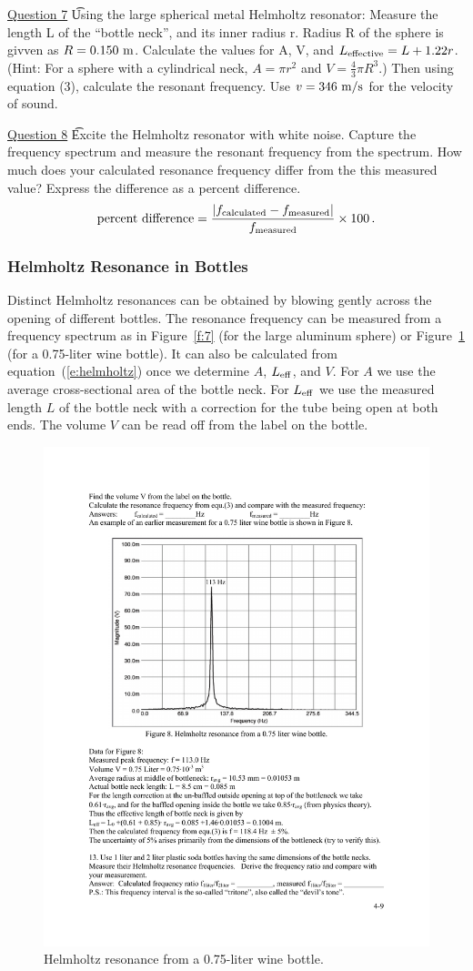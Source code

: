 \documentclass[11pt]{NSF}
\def\be{\begin{equation}}
\def\ee{\end{equation}}
\begin{document}
\underline{Question 7} \t Using the large spherical metal Helmholtz resonator: Measure the length L of the “bottle neck”, and its inner radius r. Radius R of the sphere is givven as $R=0.150~{\rm m}$. Calculate the values for A, V, and  $L_{\rm effective}=L+1.22 r$. (Hint: For a sphere with a cylindrical neck, $A=\pi r^2$ and $V = \frac{4}{3}\pi R^3$.)
Then using equation (3), calculate the resonant frequency. Use $v=346~{\rm m/s}$ for the 
velocity of sound. 
\pagebreak

\underline{Question 8} \t Excite the Helmholtz resonator with white noise. Capture the frequency spectrum and measure the resonant frequency from the spectrum. How much does your calculated resonance frequency differ from the this measured value? Express the difference as a percent difference.
\be
\text{percent difference} = 
\frac{|f_{\rm calculated}-f_{\rm measured}|}{f_{\rm measured}} 
\times 100\,.\ee

\subsubsection{Helmholtz Resonance in Bottles}

Distinct Helmholtz resonances can be obtained by blowing 
gently across the opening of different bottles. 
The resonance frequency can be measured from a 
frequency spectrum as in Figure~\ref{f:7} (for the 
large aluminum sphere) or 
Figure~\ref{f:8} (for a 0.75-liter wine bottle).
It can also be calculated from equation~(\ref{e:helmholtz})
once we determine $A$, $L_{\rm eff}$, and $V$.
For $A$ we use the average cross-sectional area of the
bottle neck.
For $L_{\rm eff}$ we use the measured length $L$ of the 
bottle neck with a correction for the tube being open at 
both ends.
The volume $V$ can be read off from the label on the bottle.
%
\begin{figure}[hbtp]
\begin{center}
\includegraphics[width=.7\textwidth]{fig4_8}
\caption{Helmholtz resonance from a 0.75-liter wine bottle.}
\label{f:8} 
\end{center} 
\end{figure}
%
\end{document}
